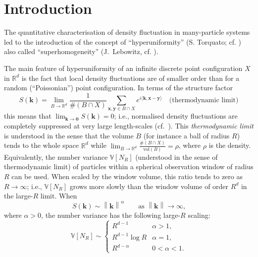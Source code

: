 \section{Introduction}\label{sec:introduction}

The quantitative characterisation of density fluctuation in many-particle systems led to the introduction of the concept of ``hyperuniformity'' (S. Torquato; cf. \cite{Torquato_Stillinger2003:local_density_fluctuations}) also called ``superhomogeneity'' (J.~Lebowitz, cf. \cite{Ghosh_Lebowitz2018:generalized_stealthy_hyperuniform_processes}).


The main feature of hyperuniformity of an infinite discrete point configuration $X$ in $\mathbb{R}^d$ is the fact that local density fluctuations are of smaller order than for a random (“Poissonian”) point configuration. In terms of the structure factor
\begin{equation*}
S(\mathbf{k})=\lim_{B\to\mathbb{R}^d}\frac1{\#(B\cap X)} \sum_{\mathbf{x},\mathbf{y}\in B\cap X}e^{i\langle\mathbf{k},\mathbf{x}-\mathbf{y}\rangle}\quad \text{(thermodynamic limit)}
\end{equation*}
this means that $\lim_{\mathbf{k}\to\mathbf{0}}S(\mathbf{k})=0$; i.e., normalised density fluctuations are completely suppressed at very large length-scales (cf.~\cite{Torquato_Stillinger2003:local_density_fluctuations}). This
\emph{thermodynamic limit} is understood in the sense that the volume $B$ (for instance a ball of radius $R$) tends to the whole space $\mathbb{R}^d$ while $\lim_{B\to\mathbb{R}^d}\frac{\#(B\cap  X)}{\mathrm{vol}(B)}=\rho$, where $\rho$ is the density. 
%
Equivalently, the number variance $\mathbb{V}[N_R]$ (understood in the sense of
thermodynamic limit) of particles within a spherical observation window of
radius $R$ can be used. When scaled by the window volume, this ratio tends to
zero as $R\to \infty$; i.e., $\mathbb{V}[N_R]$ grows more slowly than the
window volume of order $R^d$ in the large-$R$ limit. When
\begin{equation*}
S(\mathbf{k}) \sim \left\| \mathbf{k} \right\|^\alpha \qquad \text{as $\left\| \mathbf{k} \right\| \to \infty$,}
\end{equation*}
where $\alpha > 0$, the number variance has the following large-$R$ scaling: 
\begin{equation*}
\mathbb{V}[N_R] 
\sim
\begin{cases}
R^{d-1} & \alpha > 1, \\
R^{d-1} \log R & \alpha = 1, \\
R^{d-\alpha} & 0 < \alpha < 1. 
\end{cases}
\end{equation*}
